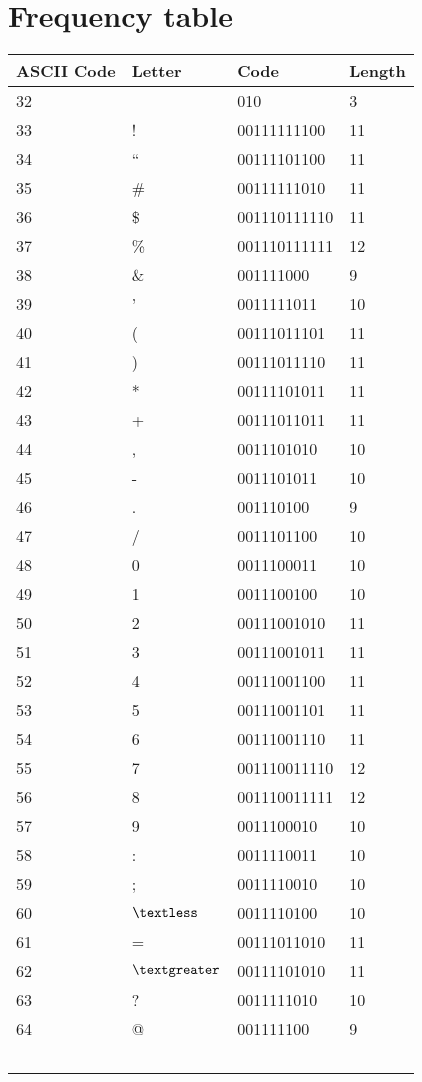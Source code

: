 \documentclass[]{article}
\begin{document}
\section{Frequency table}

\begin{center}
\begin{tabular}{ | l | l | l | l |} \hline
	﻿\textbf{ASCII Code} & ﻿\textbf{Letter} & ﻿\textbf{Code} & ﻿\textbf{Length} \\ \hline
        32 &   & 010 & 3 \\ \hline
		33 & ! & 00111111100 & 11 \\ \hline
		34 & \textquotedblleft & 00111101100 & 11 \\ \hline
		35 & \# & 00111111010 & 11 \\ \hline
		36 & \$ & 001110111110 & 11 \\ \hline
		37 & \% & 001110111111 & 12 \\ \hline
		38 & \& & 001111000    & 9 \\ \hline
		39 & '  & 0011111011   & 10 \\ \hline
		40 & (  & 00111011101  & 11 \\ \hline
		41 & )  & 00111011110  & 11 \\ \hline
		42 & *  & 00111101011  & 11 \\ \hline
		43 & +  & 00111011011  & 11 \\ \hline
		44 & ,  & 0011101010   & 10 \\ \hline
		45 & -  & 0011101011   & 10 \\ \hline
		46 & .  & 001110100    & 9 \\ \hline
		47 & /  & 0011101100   & 10 \\ \hline
		48 & 0  & 0011100011   & 10 \\ \hline
		49 & 1  & 0011100100   & 10 \\ \hline
		50 & 2  & 00111001010  & 11 \\ \hline
		51 & 3  & 00111001011  & 11 \\ \hline
		52 & 4  & 00111001100  & 11 \\ \hline
		53 & 5  & 00111001101  & 11 \\ \hline
		54 & 6  & 00111001110  & 11 \\ \hline
		55 & 7  & 001110011110 & 12 \\ \hline
		56 & 8  & 001110011111 & 12 \\ \hline
		57 & 9  & 0011100010   & 10 \\ \hline
		58 & :  & 0011110011   & 10 \\ \hline
		59 & ;  & 0011110010   & 10 \\ \hline
		60 & $\textless$ & 0011110100 & 10 \\ \hline
		61 & = & 00111011010 & 11 \\ \hline
		62 & $\textgreater$ & 00111101010 & 11 \\ \hline
		63 & ? & 0011111010 & 10 \\ \hline
		64 & @ & 001111100 & 9 \\ \hline
	﻿\end{tabular}
\end{center}
\end{document}
